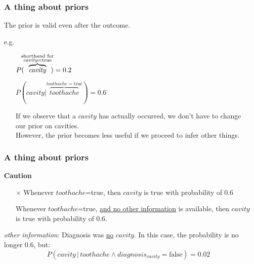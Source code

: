 \begin{frame}\frametitle{A thing about priors}

The prior is valid even after the outcome.

e.g.\\
\begin{itemize}
 \item[] $P( \kern-1ex \overbrace{\mathit{cavity}}^{\substack{\text{shorthand for}\\{\mathit{cavity}}=\text{true}}} \kern-1ex) = 0.2$
 \item[] $P(\mathit{cavity} | \overbrace{\mathit{toothache}}^{{\mathit{toothache}}=\text{true}}) = 0.6$
 \item[] If we observe that a $\mathit{cavity}$ has actually occurred, we don't have to change our prior on cavities.\\
 However, the prior becomes less useful if we proceed to infer other things.
\end{itemize}


\end{frame}

\begin{frame}\frametitle{A thing about priors}

    
\textbf{Caution}\\
\begin{itemize}
\item[$\times$] Whenever $\mathit{toothache}$=true, then $\mathit{cavity}$ is true with probability of 0.6
\item[\checkmark] Whenever $\mathit{toothache}$=true, \underline{and no other information} is available, then $\mathit{cavity}$ is true with probability of 0.6.
\end{itemize}

\textit{other information}: Diagnosis was \underline{no} $\mathit{cavity}$. In this case, the probability is no longer 0.6, but:
\begin{equation}
P(\mathit{cavity} \,|\, \mathit{toothache} \wedge diagnosis_{\mathit{cavity}} = \text{false}) = 0.02
\end{equation}

\end{frame}


